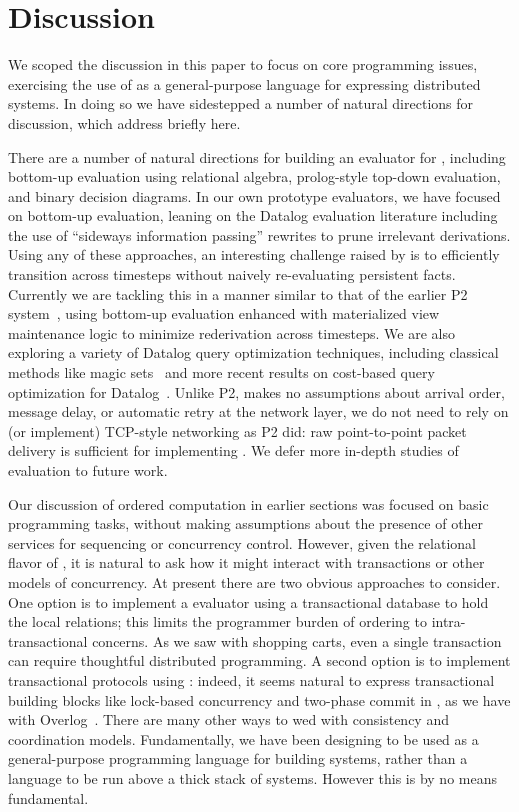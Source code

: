 \section{Discussion}
We scoped the discussion in this paper to focus on core programming issues, exercising the use of \lang as a general-purpose language for expressing distributed systems.  In doing so we have sidestepped a number of natural directions for discussion, which address briefly here.
    
There are a number of natural directions for building an evaluator for \lang, including bottom-up evaluation using relational algebra, prolog-style top-down evaluation, and binary decision diagrams.  In our own prototype evaluators, we have focused on bottom-up evaluation, leaning on the Datalog evaluation literature including the use of ``sideways information passing'' rewrites to prune irrelevant derivations.  Using any of these approaches, an interesting challenge raised by \lang is to efficiently transition across timesteps without naively re-evaluating persistent facts.  Currently we are tackling this in a manner similar to that of the earlier P2 system~\cite{cacm}, using bottom-up evaluation enhanced with materialized view maintenance logic to minimize rederivation across timesteps. We are also exploring a variety of Datalog query optimization techniques, including classical methods like magic sets~\cite{ullmanbook} and more recent results on cost-based query optimization for Datalog~\cite{demoor}.  Unlike P2, \lang makes no assumptions about arrival order, message delay, or automatic retry at the network layer, we do not need to rely on (or implement) TCP-style networking as P2 did: raw point-to-point packet delivery is sufficient for implementing \lang.  We defer more in-depth studies of \lang evaluation to future work.

Our discussion of ordered computation in earlier sections was focused on basic programming tasks, without making assumptions about the presence of other services for sequencing or concurrency control.  However, given the relational flavor of \lang, it is natural to ask how it might interact with transactions or other models of concurrency.  At present there are two obvious approaches to consider.  One option is to implement a \lang evaluator using a transactional database to hold the local \lang relations; this limits the programmer burden of ordering to intra-transactional concerns.  As we saw with shopping carts, even a single transaction can require thoughtful distributed programming.  A second option is to implement transactional protocols using \lang: indeed, it seems natural to express transactional building blocks like lock-based concurrency and two-phase commit in \lang, as we have with Overlog~\cite{netdb}.  There are many other ways to wed \lang with consistency and coordination models.  Fundamentally, we have been designing \lang to be used as a general-purpose programming language for building systems, rather than a language to be run above a thick stack of systems.  However this is by no means fundamental.

